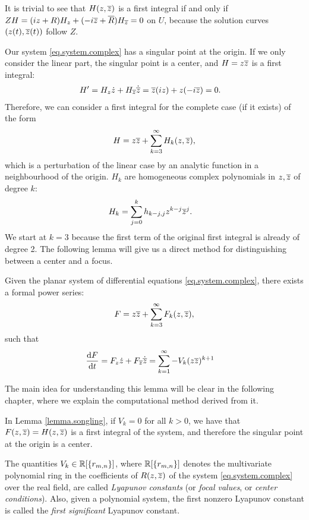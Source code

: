 It is trivial to see that $H(z,\overline{z})$ is a first integral if and only if $ZH=(iz+R)H_z+(-i\overline{z}+\overline{R})H_{\overline{z}}=0$ on $U$, because the solution curves $(z(t),\overline{z}(t))$ follow $Z$.

Our system \eqref{eq.system.complex} has a singular point at the origin. If we only consider the linear part, the singular point is a center, and $H=z\overline{z}$ is a first integral:
\begin{align*}
H' &= H_z \dot z + H_{\overline{z}} \dot {\overline{z}} = \overline{z}(iz)+z(-i\overline{z})=0.
\end{align*}
Therefore, we can consider a first integral for the complete case (if it exists) of the form
\begin{align}
H=z\overline{z}+\sum_{k=3}^\infty H_k(z,\overline{z}),
\label{eq.first_integral}
\end{align}
which is a perturbation of the linear case by an analytic function in a neighbourhood of the origin. $H_k$ are homogeneous complex polynomials in $z,\overline{z}$ of degree $k$:
\begin{align}
H_k &= \sum_{j=0}^k h_{k-j,j}z^{k-j}\overline{z}^j.
\end{align}
We start at $k=3$ because the first term of the original first integral is already of degree 2. The following lemma will give us a direct method for distinguishing between a center and a focus.

\begin{lemma}
\label{lemma.songling}
Given the planar system of differential equations \eqref{eq.system.complex}, there exists a formal power series:
\begin{align*}
F=z\overline{z}+\sum_{k=3}^\infty F_k(z,\overline{z}),
\end{align*}
such that
\begin{align*}
\frac{\mathrm{d} F}{\mathrm{d} t} &= F_z\dot z+F_{\overline{z}}\dot{\overline{z}} = \sum_{k=1}^\infty -V_k(z\overline{z})^{k+1}
\end{align*}
\end{lemma}
The main idea for understanding this lemma will be clear in the following chapter, where we explain the computational method derived from it.

\begin{observacio}
In Lemma \ref{lemma.songling}, if $V_k=0$ for all $k>0$, we have that $F(z,\overline{z})=H(z,\overline{z})$ is a first integral of the system, and therefore the singular point at the origin is a center.
\end{observacio}

\begin{definicio}
The quantities $V_k\in\mathbb{R}[\{r_{m,n}\}]$, where $\mathbb{R}[\{r_{m,n}\}]$ denotes the multivariate polynomial ring in the coefficients of $R(z,\overline{z})$ of the system \eqref{eq.system.complex} over the real field, are called \emph{Lyapunov constants} (or \emph{focal values}, or \emph{center conditions}). Also, given a polynomial system, the first nonzero Lyapunov constant is called the \emph{first significant} Lyapunov constant.
\end{definicio}

